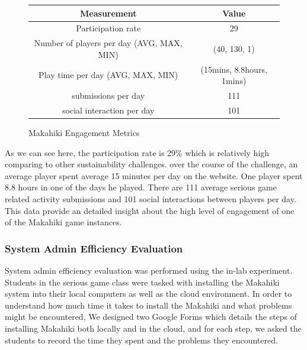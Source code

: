 \documentclass{sigchi}
\newcommand\tabhead[1]{\small\textbf{#1}}
\begin{document}
\begin{figure}[ht!]
  \centering
  \begin{tabular}{|c|c|}
    \hline
    \multicolumn{1}{|p{0.5\columnwidth}|}{\centering\tabhead{Measurement}} &
    \multicolumn{1}{|p{0.5\columnwidth}|}{\centering\tabhead{Value}} \\
    \hline
    \multicolumn{1}{|p{0.5\columnwidth}|}{Participation rate} &
    \multicolumn{1}{|p{0.5\columnwidth}|}{29} \\
    \hline
    \multicolumn{1}{|p{0.5\columnwidth}|}{Number of players per day (AVG, MAX, MIN)} &
    \multicolumn{1}{|p{0.5\columnwidth}|}{(40, 130, 1)} \\
    \hline
    \multicolumn{1}{|p{0.5\columnwidth}|}{Play time per day (AVG, MAX, MIN)} &
    \multicolumn{1}{|p{0.5\columnwidth}|}{(15mins, 8.8hours, 1mins)} \\
    \hline
    \multicolumn{1}{|p{0.5\columnwidth}|}{submissions per day} &
    \multicolumn{1}{|p{0.5\columnwidth}|}{111} \\
    \hline
    \multicolumn{1}{|p{0.5\columnwidth}|}{social interaction per day} &
    \multicolumn{1}{|p{0.5\columnwidth}|}{101} \\
    \hline
  \end{tabular}
  \caption{Makahiki Engagement Metrics}
  \label{fig:makahiki-engagement}
\end{figure}

As we can see here, the participation rate is 29\% which is relatively high comparing to other sustainability challenges. over the course of the challenge, an average player spent average 15 minutes per day on the website. One player spent 8.8 hours in one of the days he played. There are 111 average serious game related activity submissions and 101 social interactions between players per day. This data provide an detailed insight about the high level of engagement of one of the Makahiki game instances.

\subsubsection{System Admin Efficiency Evaluation}

System admin efficiency evaluation was performed using the in-lab experiment.
Students in the serious game class were tasked with installing the Makahiki
system into their local computers as well as the cloud environment. In
order to understand how much time it takes to install the Makahiki and
what problems might be encountered, We designed two Google Forms which
details the steps of installing Makahiki both locally and in the
cloud, and for each step, we asked the students to record the time
they spent and the problems they encountered.
\end{document}
